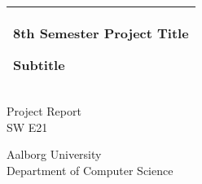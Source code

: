 %
\begin{titlepage}
  \addtolength{\hoffset}{0.5\evensidemargin-0.5\oddsidemargin} %
  \noindent%
  \begin{tabular}{@{}p{\textwidth}@{}}
    \toprule[2pt]
    \midrule
    \vspace{0.2cm}
    \begin{center}
    \Huge{\textbf{
      8th Semester Project Title%
    }}
    \end{center}
    \begin{center}
      \Large{     
      Subtitle%
      }
    \end{center}
    \vspace{0.2cm}\\
    \midrule
    \toprule[2pt]
  \end{tabular}
  \begin{center}
  
    \vspace{12cm}
    {\large
      Project Report%
    }\\
    {\Large
      SW  E21%
    }

  \end{center}
  \vfill
  \begin{center}
  Aalborg University\\
  Department of Computer Science
  \end{center}
\end{titlepage}
\clearpage
